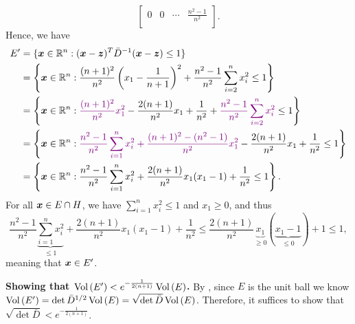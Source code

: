 \begin{enumerate}
\begin{pf}
\[\begin{bmatrix}
0&0&\cdots&\frac{n^{2}-1}{n^{2}}\\
\end{bmatrix}.
\]
Hence, we have
\begin{align*}
E'&=\{\vect{x}\in\R^n: (\vect{x}-\vect{z})^{T}\bar{D}^{-1}(\vect{x}-\vect{z})\le 1\} \\
&=\left\{\vect{x}\in\R^n: \frac{(n+1)^{2}}{n^{2}}\left(x_1-\frac{1}{n+1}\right)^{2}
+\frac{n^{2}-1}{n^{2}}\sum_{i=2}^{n}x_i^{2}\le 1\right\} \\
&=\left\{\vect{x}\in\R^n: \vc{\frac{(n+1)^{2}}{n^{2}}x_1^{2}}-\frac{2(n+1)}{n^{2}}x_1
+\frac{1}{n^{2}}+\vc{\frac{n^{2}-1}{n^{2}}\sum_{i=2}^{n}x_i^{2}}\le 1\right\} \\
&=\left\{\vect{x}\in\R^n: \vc{\frac{n^{2}-1}{n^{2}}\sum_{i=1}^{n}x_i^{2}
+\frac{(n+1)^{2}-(n^{2}-1)}{n^{2}}x_1^{2}}
-\frac{2(n+1)}{n^{2}}x_1
+\frac{1}{n^{2}}\le 1\right\} \\
&=\left\{\vect{x}\in\R^n: \frac{n^{2}-1}{n^{2}}\sum_{i=1}^{n}x_i^{2}
+\frac{2(n+1)}{n^{2}}x_1(x_1-1)
+\frac{1}{n^{2}}\le 1\right\}.
\end{align*}
For all \(\bm{x}\in E\cap H\), we have \(\sum_{i=1}^{n}x_i^{2}\le 1\) and
\(x_1\ge 0\), and thus
\[
\frac{n^{2}-1}{n^{2}}\underbrace{\sum_{i=1}^{n}x_i^{2}}_{\le 1}
+\frac{2(n+1)}{n^{2}}x_1(x_1-1)
+\frac{1}{n^{2}}
\le \frac{2(n+1)}{n^{2}}\underbrace{x_1}_{\ge 0}(\underbrace{x_1-1}_{\le 0})+1
\le 1,
\]
meaning that \(\bm{x}\in E'\).

\textbf{Showing that \(\operatorname{Vol}\left(E'\right)<e^{-\frac{1}{2(n+1)}}\operatorname{Vol}\left(E\right)\).}
By , since \(E\) is the unit ball we know
\(\operatorname{Vol}\left(E'\right) =\det \bar{D}^{1/2}\operatorname{Vol}\left(E\right)=\sqrt{\det \bar{D}}\operatorname{Vol}\left(E\right)\). Therefore,
it suffices to show that \(\sqrt{\det \bar{D}}<e^{-\frac{1}{2(n+1)}}\).


\end{pf}
\end{enumerate}
